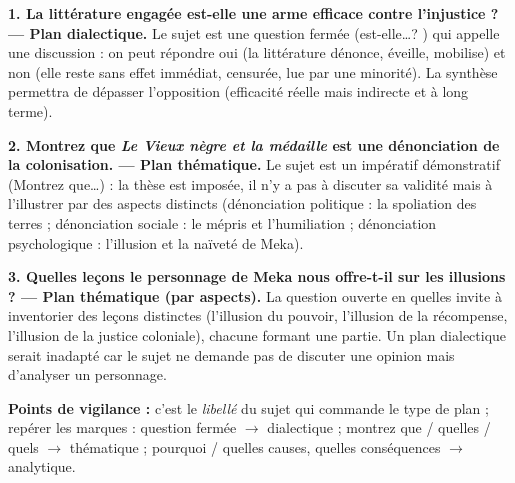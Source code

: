 \documentclass[11pt]{article}
\newcommand{\cle}[1]{{\popxbold\color{popdark}#1}}
\begin{document}
\begin{corrige}
\textbf{1. \og La littérature engagée est-elle une arme efficace contre l'injustice ? \fg{} — Plan dialectique.} Le sujet est une \cle{question fermée} (\og est-elle\ldots ? \fg{}) qui appelle une discussion : on peut répondre oui (la littérature dénonce, éveille, mobilise) et non (elle reste sans effet immédiat, censurée, lue par une minorité). La synthèse permettra de dépasser l'opposition (efficacité réelle mais indirecte et à long terme).

\textbf{2. \og Montrez que \emph{Le Vieux nègre et la médaille} est une dénonciation de la colonisation. \fg{} — Plan thématique.} Le sujet est un \cle{impératif démonstratif} (\og Montrez que\ldots \fg{}) : la thèse est imposée, il n'y a pas à discuter sa validité mais à l'illustrer par des aspects distincts (dénonciation politique : la spoliation des terres ; dénonciation sociale : le mépris et l'humiliation ; dénonciation psychologique : l'illusion et la naïveté de Meka).

\textbf{3. \og Quelles leçons le personnage de Meka nous offre-t-il sur les illusions ? \fg{} — Plan thématique (par aspects).} La question ouverte en \og quelles \fg{} invite à inventorier des leçons distinctes (l'illusion du pouvoir, l'illusion de la récompense, l'illusion de la justice coloniale), chacune formant une partie. Un plan dialectique serait inadapté car le sujet ne demande pas de discuter une opinion mais d'analyser un personnage.

\textbf{Points de vigilance :} c'est le \emph{libellé} du sujet qui commande le type de plan ; repérer les marques : question fermée $\rightarrow$ dialectique ; \og montrez que / quelles / quels \fg{} $\rightarrow$ thématique ; \og pourquoi / quelles causes, quelles conséquences \fg{} $\rightarrow$ analytique.
\end{corrige}
\end{document}
